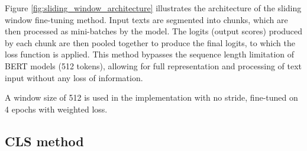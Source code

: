 Figure \ref{fig:sliding_window_architecture} illustrates the architecture of the sliding window fine-tuning method. Input texts are segmented into chunks, which are then processed as mini-batches by the model. The logits (output scores) produced by each chunk are then pooled together to produce the final logits, to which the loss function is applied. This method bypasses the sequence length limitation of BERT models (512 tokens), allowing for full representation and processing of text input without any loss of information.

A window size of 512 is used in the implementation with no stride, fine-tuned on 4 epochs with weighted loss.

\begin{comment}
The complexity of this method is as follows:
\[
    O(L \cdot T \cdot H)
\]

where L is the sequence length, T is the number of transformer layers in the BERT model (typically 12), H is Hidden size of the BERT model (dimension of the transformer's feedforward networks, typically 768).
\end{comment}

\subsection{CLS method}


